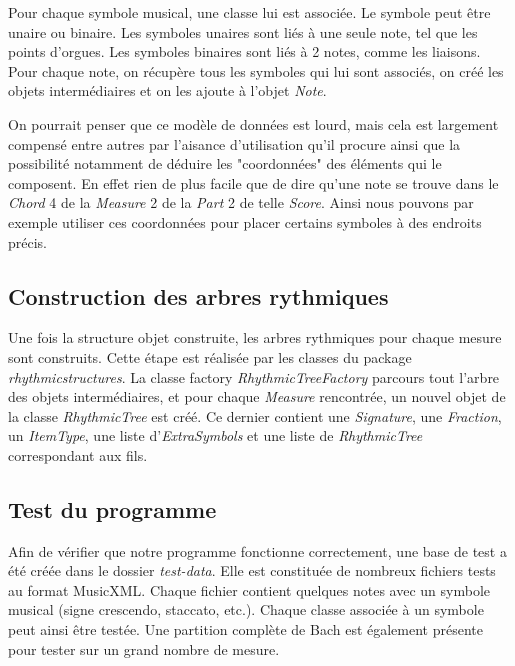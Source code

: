 \par
Pour chaque symbole musical, une classe lui est associée. Le symbole peut être unaire ou binaire.
Les symboles unaires sont liés à une seule note, tel que les points d'orgues. Les symboles binaires
sont liés à 2 notes, comme les liaisons. Pour chaque note, on récupère tous les symboles qui lui 
sont associés, on créé les objets intermédiaires et on les ajoute à l'objet \emph{Note}.


\par
On pourrait penser que ce modèle de données est lourd, mais cela est largement compensé entre autres
par l'aisance d'utilisation qu'il procure ainsi que la possibilité notamment de déduire les
"coordonnées" des éléments qui le composent. En effet rien de plus facile que de dire
qu'une note se trouve dans le \emph{Chord} 4 de la \emph{Measure} 2 de la \emph{Part}
2 de telle \emph{Score}. Ainsi nous pouvons par exemple utiliser ces coordonnées pour
placer certains symboles à des endroits précis.


\subsection{Construction des arbres rythmiques}

Une fois la structure objet construite, les arbres rythmiques pour chaque mesure sont construits. 
Cette étape est réalisée par les classes du package \emph{rhythmicstructures}. La classe factory 
\emph{RhythmicTreeFactory} parcours tout l'arbre des objets intermédiaires, et pour chaque \emph{Measure} 
rencontrée, un nouvel objet de la classe \emph{RhythmicTree} est créé. Ce dernier contient une 
\emph{Signature}, une \emph{Fraction}, un \emph{ItemType}, une liste d'\emph{ExtraSymbols} et une 
liste de \emph{RhythmicTree} correspondant aux fils.


\subsection{Test du programme}

Afin de vérifier que notre programme fonctionne correctement, une base de test a été créée dans le dossier \emph{test-data}. Elle est constituée de nombreux fichiers tests au format MusicXML. Chaque fichier contient quelques notes avec un symbole musical (signe crescendo, staccato, etc.). Chaque classe associée à un symbole peut ainsi être testée. Une partition complète de Bach est également présente pour tester sur un grand nombre de mesure.

